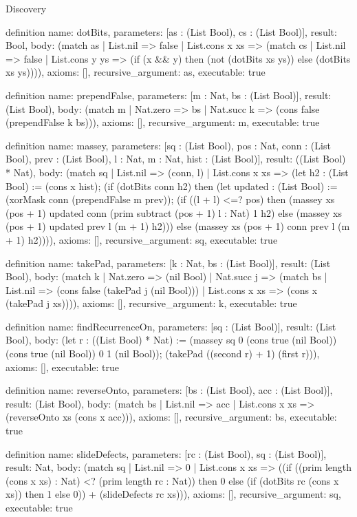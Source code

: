 \begin{lexlean}{Discovery}
\begin{semanticmodule}
definition{
  name: dotBits,
  parameters: [as : (List Bool), cs : (List Bool)],
  result: Bool,
  body: (match as
    | List.nil => false
    | List.cons x xs => (match cs
    | List.nil => false
    | List.cons y ys => (if (x && y) then (not (dotBits xs ys)) else (dotBits xs ys)))),
  axioms: [],
  recursive_argument: as,
  executable: true
}

definition{
  name: prependFalse,
  parameters: [m : Nat, bs : (List Bool)],
  result: (List Bool),
  body: (match m
    | Nat.zero => bs
    | Nat.succ k => (cons false (prependFalse k bs))),
  axioms: [],
  recursive_argument: m,
  executable: true
}

definition{
  name: massey,
  parameters: [sq : (List Bool), pos : Nat, conn : (List Bool), prev : (List Bool), l : Nat, m : Nat, hist : (List Bool)],
  result: ((List Bool) * Nat),
  body: (match sq
    | List.nil => (conn, l)
    | List.cons x xs => (let h2 : (List Bool) := (cons x hist); (if (dotBits conn h2) then (let updated : (List Bool) := (xorMask conn (prependFalse m prev)); (if ((l + l) <=? pos) then (massey xs (pos + 1) updated conn (prim subtract (pos + 1) l : Nat) 1 h2) else (massey xs (pos + 1) updated prev l (m + 1) h2))) else (massey xs (pos + 1) conn prev l (m + 1) h2)))),
  axioms: [],
  recursive_argument: sq,
  executable: true
}

definition{
  name: takePad,
  parameters: [k : Nat, bs : (List Bool)],
  result: (List Bool),
  body: (match k
    | Nat.zero => (nil Bool)
    | Nat.succ j => (match bs
    | List.nil => (cons false (takePad j (nil Bool)))
    | List.cons x xs => (cons x (takePad j xs)))),
  axioms: [],
  recursive_argument: k,
  executable: true
}

definition{
  name: findRecurrenceOn,
  parameters: [sq : (List Bool)],
  result: (List Bool),
  body: (let r : ((List Bool) * Nat) := (massey sq 0 (cons true (nil Bool)) (cons true (nil Bool)) 0 1 (nil Bool)); (takePad ((second r) + 1) (first r))),
  axioms: [],
  executable: true
}

definition{
  name: reverseOnto,
  parameters: [bs : (List Bool), acc : (List Bool)],
  result: (List Bool),
  body: (match bs
    | List.nil => acc
    | List.cons x xs => (reverseOnto xs (cons x acc))),
  axioms: [],
  recursive_argument: bs,
  executable: true
}

definition{
  name: slideDefects,
  parameters: [rc : (List Bool), sq : (List Bool)],
  result: Nat,
  body: (match sq
    | List.nil => 0
    | List.cons x xs => ((if ((prim length (cons x xs) : Nat) <? (prim length rc : Nat)) then 0 else (if (dotBits rc (cons x xs)) then 1 else 0)) + (slideDefects rc xs))),
  axioms: [],
  recursive_argument: sq,
  executable: true
}


\end{semanticmodule}
\end{lexlean}
